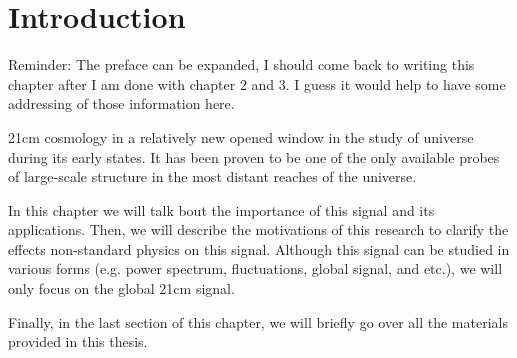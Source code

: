 \documentclass[12pt, TexShade, letterpaper]{report}
\begin{document}
	\listoffigures\thispagestyle{plain}
	\listoftables
	\glsaddall
	\setlength\LTleft{0pt}
	\setlength\LTright{0pt}
	\setlength\glsdescwidth{0.8\hsize}
	\printglossary[title={List of Acronyms}]

 	\clearpage
	
	\glsresetall
\chapter{Introduction}
\label{chap:intro}
Reminder: The preface can be expanded, I should come back to writing this chapter after I am done with chapter 2 and 3. I guess it would help to have some addressing of those information here. \par
21cm cosmology in a relatively new opened window in the study of universe during its early states. It has been proven to be one of the only available probes of large-scale structure in the most distant reaches of the universe\cite{primordial_universe}.\par
In this chapter we will talk bout the importance of this signal and its applications. Then, we will describe the motivations of this research to clarify the effects non-standard physics on this signal. Although this signal can be studied in various forms (e.g. power spectrum, fluctuations, global signal, and etc.), we will only focus on the global 21cm signal.\par
Finally, in the last section of this chapter, we will briefly go over all the materials provided in this thesis.\par
\end{document}
